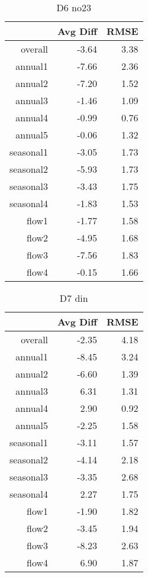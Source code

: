 \begin{table}[H]
\centering
\begin{tabular}{rrr}
  \hline
 & Avg Diff & RMSE \\ 
  \hline
overall & -3.64 & 3.38 \\ 
  annual1 & -7.66 & 2.36 \\ 
  annual2 & -7.20 & 1.52 \\ 
  annual3 & -1.46 & 1.09 \\ 
  annual4 & -0.99 & 0.76 \\ 
  annual5 & -0.06 & 1.32 \\ 
  seasonal1 & -3.05 & 1.73 \\ 
  seasonal2 & -5.93 & 1.73 \\ 
  seasonal3 & -3.43 & 1.75 \\ 
  seasonal4 & -1.83 & 1.53 \\ 
  flow1 & -1.77 & 1.58 \\ 
  flow2 & -4.95 & 1.68 \\ 
  flow3 & -7.56 & 1.83 \\ 
  flow4 & -0.15 & 1.66 \\ 
   \hline
\end{tabular}
\caption{D6 no23} 
\end{table}
\begin{table}[H]
\centering
\begin{tabular}{rrr}
  \hline
 & Avg Diff & RMSE \\ 
  \hline
overall & -2.35 & 4.18 \\ 
  annual1 & -8.45 & 3.24 \\ 
  annual2 & -6.60 & 1.39 \\ 
  annual3 & 6.31 & 1.31 \\ 
  annual4 & 2.90 & 0.92 \\ 
  annual5 & -2.25 & 1.58 \\ 
  seasonal1 & -3.11 & 1.57 \\ 
  seasonal2 & -4.14 & 2.18 \\ 
  seasonal3 & -3.35 & 2.68 \\ 
  seasonal4 & 2.27 & 1.75 \\ 
  flow1 & -1.90 & 1.82 \\ 
  flow2 & -3.45 & 1.94 \\ 
  flow3 & -8.23 & 2.63 \\ 
  flow4 & 6.90 & 1.87 \\ 
   \hline
\end{tabular}
\caption{D7 din} 
\end{table}

